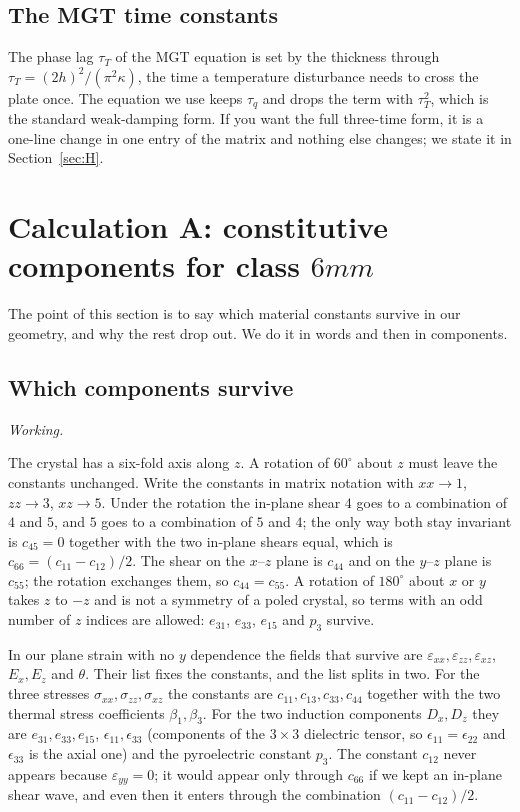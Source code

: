 \documentclass[11pt,a4paper]{article}
\newif\ifshowworked \showworkedtrue
\newenvironment{worked}{\ifshowworked\par\smallskip\noindent\textit{Working.}\par\else\setbox0\vbox\bgroup\fi}{\ifshowworked\par\smallskip\else\egroup\fi}
\newcommand{\eps}{\varepsilon}
\begin{document}
\subsection{The MGT time constants}

The phase lag $\tau_T$ of the MGT equation is set by the thickness through $\tau_T=(2h)^2/(\pi^2\kappa)$,
the time a temperature disturbance needs to cross the plate once. The equation we use keeps $\tau_q$ and
drops the term with $\tau_T^2$, which is the standard weak-damping form. If you want the full three-time
form, it is a one-line change in one entry of the matrix and nothing else changes; we state it in
Section~\ref{sec:H}.

\section{Calculation A: constitutive components for class $6mm$}\label{sec:A}

The point of this section is to say which material constants survive in our geometry, and why the rest
drop out. We do it in words and then in components.

\subsection{Which components survive}

\begin{worked}
The crystal has a six-fold axis along $z$. A rotation of $60^\circ$ about $z$ must leave the constants
unchanged. Write the constants in matrix notation with $xx\to1$, $zz\to3$, $xz\to5$. Under the rotation the
in-plane shear $4$ goes to a combination of $4$ and $5$, and $5$ goes to a combination of $5$ and $4$; the
only way both stay invariant is $c_{45}=0$ together with the two in-plane shears equal, which is
$c_{66}=(c_{11}-c_{12})/2$. The shear on the $x$--$z$ plane is $c_{44}$ and on the $y$--$z$ plane is $c_{55}$;
the rotation exchanges them, so $c_{44}=c_{55}$. A rotation of $180^\circ$ about $x$ or $y$ takes $z$ to
$-z$ and is not a symmetry of a poled crystal, so terms with an odd number of $z$ indices are allowed:
$e_{31}$, $e_{33}$, $e_{15}$ and $p_3$ survive.
\end{worked}

In our plane strain with no $y$ dependence the fields that survive are $\eps_{xx},\eps_{zz},\eps_{xz}$,
$E_x,E_z$ and $\theta$. Their list fixes the constants, and the list splits in two. For the three stresses
$\sigma_{xx},\sigma_{zz},\sigma_{xz}$ the constants are $c_{11},c_{13},c_{33},c_{44}$ together with the two
thermal stress coefficients $\beta_1,\beta_3$. For the two induction components $D_x,D_z$ they are
$e_{31},e_{33},e_{15}$, $\epsilon_{11},\epsilon_{33}$ (components of the $3\times3$ dielectric tensor, so
$\epsilon_{11}=\epsilon_{22}$ and $\epsilon_{33}$ is the axial one) and the pyroelectric constant $p_3$.
The constant $c_{12}$ never appears because $\eps_{yy}=0$; it would appear only through $c_{66}$ if we kept an in-plane
shear wave, and even then it enters through the combination $(c_{11}-c_{12})/2$.
\end{document}
